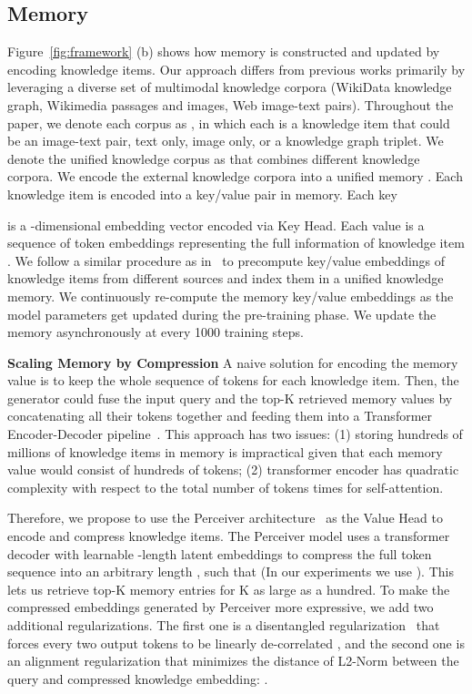 \documentclass[10pt,twocolumn,letterpaper]{article}
\begin{document}
\subsection{Memory} \label{sec:memory}
Figure~\ref{fig:framework} (b) shows how memory is constructed and updated by encoding knowledge items.
Our approach differs from previous works primarily by leveraging a diverse set of multimodal knowledge corpora (WikiData knowledge graph, Wikimedia passages and images, Web image-text pairs). Throughout the paper, we denote each corpus as , in which each  is a knowledge item that could be an image-text pair, text only, image only, or a knowledge graph triplet. We denote the unified knowledge corpus as  that combines  different knowledge corpora. 
We encode the external knowledge corpora into a unified memory . Each knowledge item  is encoded into a key/value pair  in memory.  Each key

is a -dimensional embedding vector encoded via Key Head. 
Each value is a sequence of token embeddings representing the full information of knowledge item .
We follow a similar procedure as in~\cite{DBLP:journals/corr/abs-2002-08909} to precompute key/value embeddings of knowledge items from different sources and index them in a unified knowledge memory.
We continuously re-compute the memory key/value embeddings as the model parameters get updated during the pre-training phase. We update the memory  asynchronously at every 1000 training steps.

\textbf{Scaling Memory by Compression}
A naive solution for encoding the memory value is to keep the whole sequence of tokens for each knowledge item. Then, the generator could fuse the input query and the top-K retrieved memory values by concatenating all their tokens together and feeding them into a Transformer Encoder-Decoder pipeline~\cite{DBLP:conf/nips/LewisPPPKGKLYR020}. This approach has two issues: (1) storing hundreds of millions of knowledge items in memory is impractical given that each memory value would consist of hundreds of tokens; (2) transformer encoder has quadratic complexity with respect to the total number of tokens times  for self-attention. 

Therefore, we propose to use the Perceiver architecture~\cite{DBLP:conf/icml/JaegleGBVZC21} as the Value Head to encode and compress knowledge items. The Perceiver model uses a transformer decoder  with learnable -length latent embeddings to compress the full token sequence into an arbitrary length , such that  (In our experiments we use ).
This lets us retrieve top-K memory entries for K as large as a hundred.
To make the compressed embeddings generated by Perceiver more expressive, we add two additional regularizations. The first one is a disentangled regularization~\cite{DBLP:journals/corr/abs-2205-09797} that forces every two output tokens to be linearly de-correlated , and
the second one is an alignment regularization that minimizes the distance of L2-Norm between the query and compressed knowledge embedding: .
\end{document}
